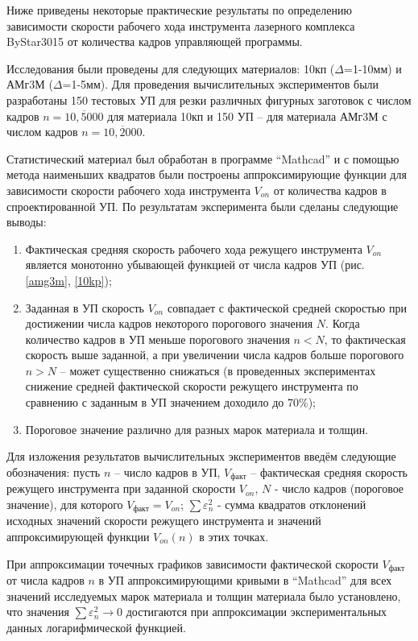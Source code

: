 \documentclass{article}
\begin{document}
Ниже приведены некоторые практические результаты
по определению зависимости скорости рабочего хода
инструмента лазерного комплекса ByStar3015
от количества кадров управляющей программы.

Исследования были проведены для следующих материалов:
10кп ($\Delta$=1-10мм) и АМг3М ($\Delta$=1-5мм).
Для проведения вычислительных экспериментов были разработаны
150 тестовых УП для резки различных фигурных заготовок с числом кадров
$n=\overline{10,5000}$
для материала 10кп и 150 УП – для материала АМг3М с числом кадров
$n=\overline{10,2000}$.

Статистический материал был обработан в программе “Mathcad”
и с помощью метода наименьших квадратов были построены
аппроксимирующие функции для зависимости скорости
рабочего хода инструмента
$V_{on}$
от количества кадров в спроектированной УП.
По результатам эксперимента были сделаны следующие выводы:

\begin{enumerate}
\item Фактическая средняя скорость рабочего хода режущего инструмента
$V_{on}$
является монотонно убывающей функцией от числа кадров УП
(рис. \ref{amg3m}, \ref{10kp});

\item Заданная в УП скорость
$V_{on}$
совпадает с фактической средней скоростью
при достижении числа кадров некоторого порогового значения $N$.
Когда количество кадров в УП меньше порогового значения $n<N$,
то фактическая скорость выше заданной,
а при увеличении числа кадров больше порогового $n>N$
– может существенно снижаться
(в проведенных экспериментах снижение средней
фактической скорости режущего инструмента по сравнению
с заданным в УП значением доходило до 70\%);

\item Пороговое значение различно для разных марок материала и толщин.

\end{enumerate}

Для изложения результатов вычислительных экспериментов
введём следующие обозначения:
пусть
$n$  – число кадров в УП,
$V_\text{факт}$  – фактическая средняя скорость режущего инструмента при заданной скорости $V_{on}$,
$N$ - число кадров (пороговое значение), для которого $V_\text{факт}=V_{on}$;
$\sum \varepsilon_n^2$  - сумма квадратов отклонений исходных значений
скорости режущего инструмента и значений аппроксимирующей функции $V_{on}(n)$
в этих точках.

При аппроксимации точечных графиков
зависимости фактической скорости
$V_\text{факт}$
от числа кадров $n$
в УП аппроксимирующими кривыми в “Mathcad”
для всех значений исследуемых марок материала и толщин материала было установлено,
что значения
$\sum \varepsilon_n^2 \to 0$
достигаются при аппроксимации экспериментальных данных логарифмической функцией.
\end{document}
